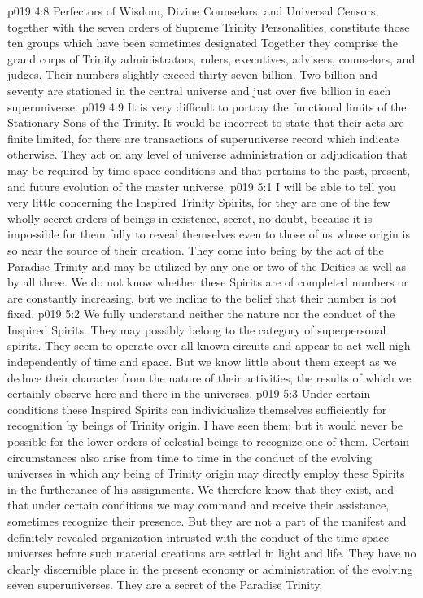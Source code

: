 \pc \vs p019 4:8 Perfectors of Wisdom, Divine Counselors, and Universal Censors, together with the seven orders of Supreme Trinity Personalities, constitute those ten groups which have been sometimes designated  Together they comprise the grand corps of Trinity administrators, rulers, executives, advisers, counselors, and judges. Their numbers slightly exceed thirty\hyp{}seven billion. Two billion and seventy are stationed in the central universe and just over five billion in each superuniverse.
\vs p019 4:9 It is very difficult to portray the functional limits of the Stationary Sons of the Trinity. It would be incorrect to state that their acts are finite limited, for there are transactions of superuniverse record which indicate otherwise. They act on any level of universe administration or adjudication that may be required by time\hyp{}space conditions and that pertains to the past, present, and future evolution of the master universe.
\vs p019 5:1 I will be able to tell you very little concerning the Inspired Trinity Spirits, for they are one of the few wholly secret orders of beings in existence, secret, no doubt, because it is impossible for them fully to reveal themselves even to those of us whose origin is so near the source of their creation. They come into being by the act of the Paradise Trinity and may be utilized by any one or two of the Deities as well as by all three. We do not know whether these Spirits are of completed numbers or are constantly increasing, but we incline to the belief that their number is not fixed.
\vs p019 5:2 We fully understand neither the nature nor the conduct of the Inspired Spirits. They may possibly belong to the category of superpersonal spirits. They seem to operate over all known circuits and appear to act well\hyp{}nigh independently of time and space. But we know little about them except as we deduce their character from the nature of their activities, the results of which we certainly observe here and there in the universes.\plusone
\vs p019 5:3 Under certain conditions these Inspired Spirits can individualize themselves sufficiently for recognition by beings of Trinity origin. I have seen them; but it would never be possible for the lower orders of celestial beings to recognize one of them. Certain circumstances also arise from time to time in the conduct of the evolving universes in which any being of Trinity origin may directly employ these Spirits in the furtherance of his assignments. We therefore know that they exist, and that under certain conditions we may command and receive their assistance, sometimes recognize their presence. But they are not a part of the manifest and definitely revealed organization intrusted with the conduct of the time\hyp{}space universes before such material creations are settled in light and life. They have no clearly discernible place in the present economy or administration of the evolving seven superuniverses. They are a secret of the Paradise Trinity.
